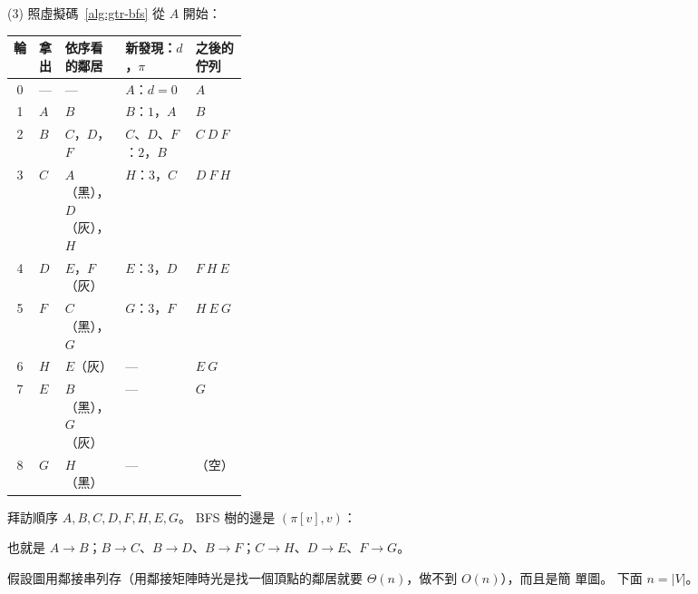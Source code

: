 (3) 照虛擬碼~\ref{alg:gtr-bfs} 從 $A$ 開始：

\begin{center}
\small
\begin{tabular}{cll>{\raggedright\arraybackslash}p{0.3\linewidth}l}
\toprule
輪 & 拿出 & 依序看的鄰居 & 新發現：$d$，$\pi$ & 之後的佇列 \\
\midrule
0 & --- & --- & $A$：$d = 0$ & $A$ \\
1 & $A$ & $B$ & $B$：$1$，$A$ & $B$ \\
2 & $B$ & $C$，$D$，$F$ & $C$、$D$、$F$：$2$，$B$ & $C\ D\ F$ \\
3 & $C$ & $A$（黑），$D$（灰），$H$ & $H$：$3$，$C$ & $D\ F\ H$ \\
4 & $D$ & $E$，$F$（灰） & $E$：$3$，$D$ & $F\ H\ E$ \\
5 & $F$ & $C$（黑），$G$ & $G$：$3$，$F$ & $H\ E\ G$ \\
6 & $H$ & $E$（灰） & --- & $E\ G$ \\
7 & $E$ & $B$（黑），$G$（灰） & --- & $G$ \\
8 & $G$ & $H$（黑） & --- & （空） \\
\bottomrule
\end{tabular}
\end{center}

拜訪順序 $A, B, C, D, F, H, E, G$。 BFS 樹的邊是 $(\pi[v], v)$：

\begin{center}
\end{center}

也就是 $A \to B$；$B \to C$、$B \to D$、$B \to F$；$C \to H$、$D \to E$、$F \to G$。

假設圖用鄰接串列存（用鄰接矩陣時光是找一個頂點的鄰居就要 $\Theta(n)$，做不到 $O(n)$），而且是簡
單圖。 下面 $n = |V|$。

